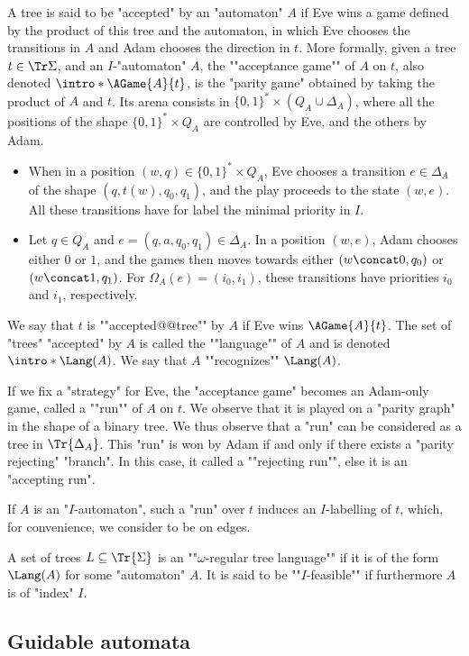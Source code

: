 \documentclass[a4paper,UKenglish,cleveref, autoref, thm-restate]{lipics-v2021}
\newcommand{\A}{{A}}
\begin{document}
\AP A tree is said to be "accepted" by an "automaton" $A$ if Eve wins a game defined by the product of this tree and the automaton, in which Eve chooses the transitions in $A$ and Adam chooses the direction in $t$. More formally, given a tree $t \in \Tr\Sigma$, and an $I$-"automaton" $A$, the ""acceptance game"" of $A$ on $t$, also denoted $\intro*\AGame{A}{t}$, is the "parity game" obtained by taking the product of $A$ and $t$. Its arena consists in $\{0,1\}^*\times (Q_A \cup \Delta_A)$, where all the positions of the shape $\{0,1\}^*\times Q_A$ are controlled by Eve, and the others by Adam. 
\begin{itemize}
	\item When in a position $(w,q) \in \{0,1\}^* \times Q_A$, Eve chooses a transition $e\in \Delta_A$ of the shape $(q,t(w),q_0,q_1)$, and the play proceeds to the state $(w,e)$. All these transitions have for label the minimal priority in $I$.
	\item Let $q\in Q_A$ and $e=(q,a,q_0,q_1) \in \Delta_A$. In a position $(w,e)$, Adam chooses either $0$ or $1$, and the games then moves towards either $(w\concat 0, q_0)$ or $(w\concat 1, q_1)$. For $\Omega_A(e) = (i_0,i_1)$, these transitions have priorities $i_0$ and $i_1$, respectively.
\end{itemize}
\AP We say that $t$ is ""accepted@@tree"" by $A$ if Eve wins $\AGame{A}{t}$. The set of "trees" "accepted" by $A$ is called the ""language"" of $A$ and is denoted $\intro*\Lang(A)$. We say that $\A$ ""recognizes"" $\Lang(A)$.

\AP If we fix a "strategy" for Eve, the "acceptance game" becomes an Adam-only game, called a ""run"" of $A$ on $t$. We observe that it is played on a "parity graph" in the shape of a binary tree. We thus observe that a "run" can be considered as a tree in $\Tr{\Delta_A}$. This "run" is won by Adam if and only if there exists a "parity rejecting" "branch". In this case, it called a ""rejecting run"", else it is an "accepting run".

If $A$ is an "$I$-automaton", such a "run" over $t$ induces an $I$-labelling of $t$, which, for convenience, we consider to be on edges.



\AP A set of trees $L \subseteq \Tr{\Sigma}$ is an ""$\omega$-regular tree language"" if it is of the form $\Lang(A)$ for some "automaton" $A$. It is said  to be ""$I$-feasible"" if furthermore $A$ is of "index" $I$.

\subsection{Guidable automata}
\end{document}
